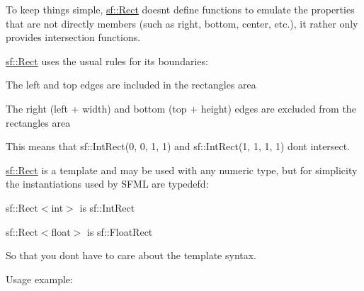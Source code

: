 To keep things simple, \mbox{\hyperlink{classsf_1_1_rect}{sf\+::\+Rect}} doesn\textquotesingle{}t define functions to emulate the properties that are not directly members (such as right, bottom, center, etc.), it rather only provides intersection functions.

\mbox{\hyperlink{classsf_1_1_rect}{sf\+::\+Rect}} uses the usual rules for its boundaries\+: \begin{DoxyItemize}
\item The left and top edges are included in the rectangle\textquotesingle{}s area \item The right (left + width) and bottom (top + height) edges are excluded from the rectangle\textquotesingle{}s area\end{DoxyItemize}
This means that sf\+::\+Int\+Rect(0, 0, 1, 1) and sf\+::\+Int\+Rect(1, 1, 1, 1) don\textquotesingle{}t intersect.

\mbox{\hyperlink{classsf_1_1_rect}{sf\+::\+Rect}} is a template and may be used with any numeric type, but for simplicity the instantiations used by S\+F\+ML are typedef\textquotesingle{}d\+: \begin{DoxyItemize}
\item sf\+::\+Rect$<$int$>$ is sf\+::\+Int\+Rect \item sf\+::\+Rect$<$float$>$ is sf\+::\+Float\+Rect\end{DoxyItemize}
So that you don\textquotesingle{}t have to care about the template syntax.

Usage example\+: 
\begin{DoxyCode}{0}
\DoxyCodeLine{\textcolor{comment}{// Define a rectangle, located at (0, 0) with a size of 20x5}}
\DoxyCodeLine{}
\DoxyCodeLine{\textcolor{comment}{// Define another rectangle, located at (4, 2) with a size of 18x10}}
\DoxyCodeLine{}
\DoxyCodeLine{\textcolor{comment}{// Test intersections with the point (3, 1)}}
\DoxyCodeLine{}
\DoxyCodeLine{\textcolor{comment}{// Test the intersection between r1 and r2}}
\DoxyCodeLine{\textcolor{comment}{// result == (4, 2, 16, 3)}}
\end{DoxyCode}
 \begin{DoxyVerb}\end{DoxyVerb}
 

